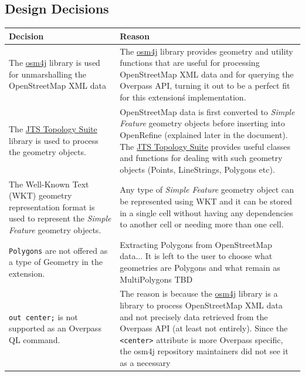 \subsection{Design Decisions}
\begin{table}
    \begin{tabularx}{\textwidth}{| X | X |}
        \hline
        \textbf{Decision} & \textbf{Reason}\\[1cm]
        \hline
        The \href{https://github.com/topobyte/osm4j}{osm4j} library is used for unmarshalling the OpenStreetMap XML data &
        The \href{https://github.com/topobyte/osm4j}{osm4j} library provides geometry and utility functions that are
        useful for processing OpenStreetMap XML data and for querying the Overpass API,
        turning it out to be a perfect fit for this extension\'s implementation.\\
        \hline
        The \href{https://github.com/locationtech/jts}{JTS Topology Suite} library is used to process the geometry objects. &
        OpenStreetMap data is first converted to \textit{Simple Feature} geometry objects before inserting into OpenRefine (explained later in the document).
        The \href{https://github.com/locationtech/jts}{JTS Topology Suite} provides useful classes and functions for dealing with such geometry objects (Points, LineStrings, Polygons etc).\\
        \hline
        The Well-Known Text (WKT) geometry representation format is used to represent the \textit{Simple Feature} geometry objects. &
        Any type of \textit{Simple Feature} geometry object can be represented using WKT and it can be stored in a single
        cell without having any dependencies to another cell or needing more than one cell.\\
        \hline
        \texttt{Polygons} are not offered as a type of Geometry in the extension. &
        Extracting Polygons from OpenStreetMap data... It is left to the user to choose what geometries are Polygons and
        what remain as MultiPolygons TBD\\
        \hline
        \texttt{out center;} is not supported as an Overpass QL command. &
        The reason is because the \href{https://github.com/topobyte/osm4j}{osm4j} library is a library to process OpenStreetMap
        XML data and not precisely data retrieved from the Overpass API (at least not entirely). Since the
        \texttt{<center>} attribute is more Overpass specific, the osm4j repository maintainers did not see it as a necessary

\end{tabularx}
\end{table}
